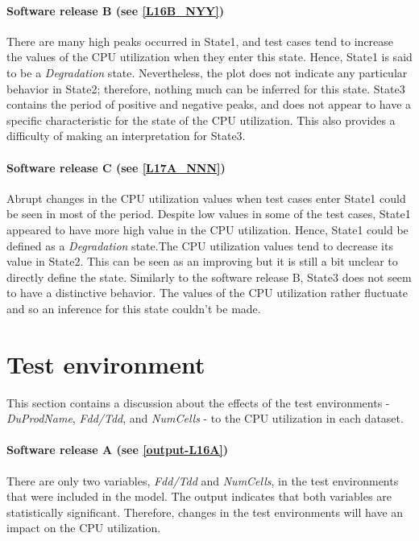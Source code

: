 \paragraph*{Software release B (see \ref{L16B_NYY})}

There are many high peaks occurred in State1, and test cases tend
to increase the values of the CPU utilization when they enter this
state. Hence, State1 is said to be a \emph{Degradation} state. Nevertheless,
the plot does not indicate any particular behavior in State2; therefore,
nothing much can be inferred for this state. State3 contains the period
of positive and negative peaks, and does not appear to have a specific
characteristic for the state of the CPU utilization. This also provides
a difficulty of making an interpretation for State3.

\paragraph{Software release C (see \ref{L17A_NNN})}

Abrupt changes in the CPU utilization values when test cases enter
State1 could be seen in most of the period. Despite low values in
some of the test cases, State1 appeared to have more high value in
the CPU utilization. Hence, State1 could be defined as a \emph{Degradation}
state.The CPU utilization values tend to decrease its value in State2.
This can be seen as an improving but it is still a bit unclear to
directly define the state. Similarly to the software release B, State3
does not seem to have a distinctive behavior. The values of the CPU
utilization rather fluctuate and so an inference for this state couldn't
be made.

\section{Test environment}

This section contains a discussion about the effects of the test environments
- \emph{DuProdName}, \emph{Fdd/Tdd}, and \emph{NumCells} - to the
CPU utilization in each dataset. 

\paragraph{Software release A (see \ref{output-L16A})}

There are only two variables, \emph{Fdd/Tdd} and \emph{NumCells},
in the test environments that were included in the model. The output
indicates that both variables are statistically significant. Therefore,
changes in the test environments will have an impact on the CPU utilization.

